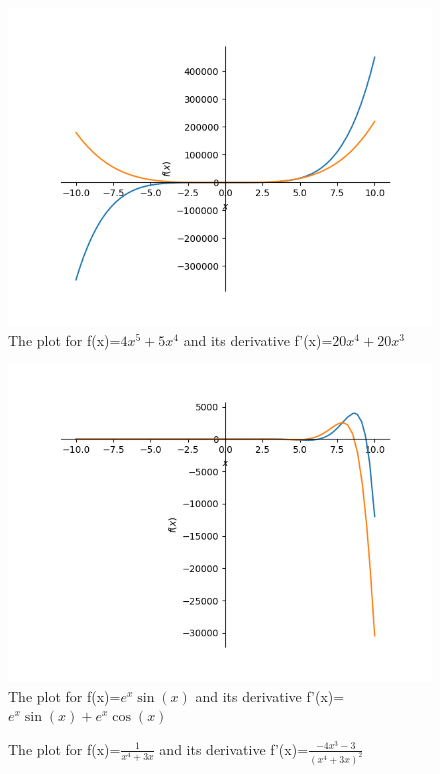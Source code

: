 \documentclass{article}
\begin{document}
\begin{figure}
\caption{The plot for f(x)=$4 x^{5} + 5 x^{4}$ and its derivative f'(x)=$20 x^{4} + 20 x^{3}$}
\centering
\includegraphics{plot_1}
\end{figure}\begin{figure}
\caption{The plot for f(x)=$e^{x} \sin{\left(x \right)}$ and its derivative f'(x)=$e^{x} \sin{\left(x \right)} + e^{x} \cos{\left(x \right)}$}
\centering
\includegraphics{plot_2}
\end{figure}\begin{figure}
\caption{The plot for f(x)=$\frac{1}{x^{4} + 3 x}$ and its derivative f'(x)=$\frac{- 4 x^{3} - 3}{\left(x^{4} + 3 x\right)^{2}}$}
\centering

\end{figure}
\end{document}
